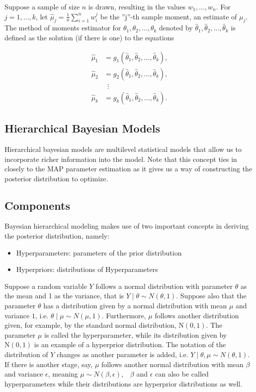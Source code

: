 \documentclass[english]{article}
\numberwithin{equation}{section}
\begin{document}
Suppose a sample of size $n$ is drawn, resulting in the values $w_1, \dots, w_n$. For $j=1,\dots,k$, let 
$\widehat\mu_j = \frac{1}{n} \sum_{i=1}^n w_i^j$
be the ''j''-th sample moment, an estimate of $\mu_j$. The method of moments estimator for $\theta_1, \theta_2, \ldots, \theta_k$  denoted by $\widehat\theta_1, \widehat\theta_2, \dots, \widehat\theta_k $ is defined as the solution (if there is one) to the equations

\begin{align}
\widehat \mu_1 & = g_1(\widehat\theta_1, \widehat\theta_2, \ldots, \widehat\theta_k), \\
\widehat \mu_2 & = g_2(\widehat\theta_1, \widehat\theta_2, \ldots, \widehat\theta_k), \\
& \,\,\, \vdots \\
\widehat \mu_k & = g_k(\widehat\theta_1, \widehat\theta_2, \ldots, \widehat\theta_k).
\end{align}

\subsection*{Hierarchical Bayesian Models}

Hierarchical bayesian models are multilevel statistical models that allow us to incorporate richer information into the model. Note that this concept ties in closely to the MAP parameter estimation as it gives us a way of constructing the posterior distribution to optimize.

\subsection*{Components}

Bayesian hierarchical modeling makes use of two important concepts in deriving the posterior distribution, namely:

\begin{itemize}
	\item Hyperparameters: parameters of the prior distribution
	\item Hyperpriors: distributions of Hyperparameters
\end{itemize}

Suppose a random variable $Y$ follows a normal distribution with parameter $\theta$ as the mean and 1 as the variance, that is $Y\mid \theta \sim N(\theta,1)$. Suppose also that the parameter $\theta$ has a  distribution given by a normal distribution with mean $\mu$ and variance $1$, i.e. $\theta\mid\mu \sim N(\mu,1)$. Furthermore, $\mu$ follows another distribution given, for example, by the standard normal distribution, $\text{N}(0,1)$. The parameter $\mu$ is called the hyperparameter, while its distribution given by $\text{N}(0,1)$ is an example of a hyperprior distribution. The notation of the distribution of $Y$ changes as another parameter is added, i.e. $Y \mid \theta,\mu \sim  N(\theta,1)$. If there is another stage, say, $\mu$ follows another normal distribution with mean $\beta$ and variance $\epsilon$, meaning $\mu \sim N(\beta,\epsilon)$, $ \mbox { }$$\beta$ and $\epsilon$ can also be called hyperparameters while their distributions are hyperprior distributions as well.
\end{document}
